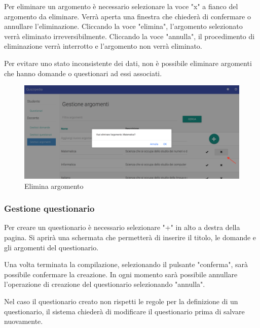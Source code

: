 \documentclass[12pt,a4paper]{article}
\begin{document}
		\par Per eliminare un argomento è necessario selezionare la voce "x" a fianco del argomento da eliminare.
		Verrà aperta una finestra che chiederà di confermare o annullare l'eliminazione. Cliccando la voce "elimina", l'argomento selezionato verrà eliminato irreversibilmente. Cliccando la voce "annulla", il procedimento di eliminazione verrà interrotto e l'argomento non verrà eliminato. \\
		\par Per evitare uno stato inconsistente dei dati, non è possibile eliminare argomenti che hanno domande o questionari ad essi associati. \\
		
			\begin{figure}[H]	
				\centering
				\includegraphics[width=1.0\linewidth]{../img/screenshot/eliminaArgomento.png}
				\caption{Elimina argomento}
				\label{Elimina argomento}
			\end{figure}
		
		\subsubsection{Gestione questionario}
		\par Per creare un questionario è necessario selezionare "+" in alto a destra della pagina. Si aprirà una schermata che permetterà di inserire il titolo, le domande e gli argomenti del questionario. \\
		\par Una volta terminata la compilazione, selezionando il pulsante "conferma", sarà possibile confermare la creazione. 
		In ogni momento sarà possibile annullare l'operazione di creazione del questionario selezionando "annulla".
		
		\par Nel caso il questionario creato non rispetti le regole per la definizione di un questionario, il sistema chiederà di modificare il questionario prima di salvare nuovamente. \\
		
\end{document}

